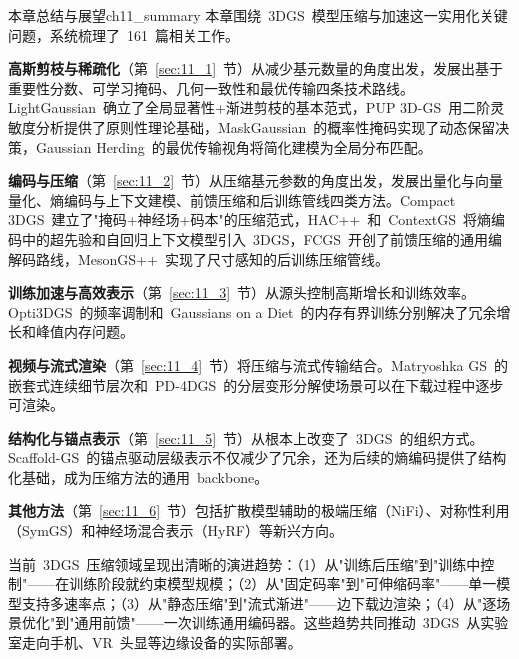 \begin{futurebox}{本章总结与展望}{ch11_summary}
本章围绕~3DGS~模型压缩与加速这一实用化关键问题，系统梳理了~161~篇相关工作。

\textbf{高斯剪枝与稀疏化}（第~\ref{sec:11_1}~节）从减少基元数量的角度出发，发展出基于重要性分数、可学习掩码、几何一致性和最优传输四条技术路线。LightGaussian~确立了全局显著性+渐进剪枝的基本范式，PUP 3D-GS~用二阶灵敏度分析提供了原则性理论基础，MaskGaussian~的概率性掩码实现了动态保留决策，Gaussian Herding~的最优传输视角将简化建模为全局分布匹配。

\textbf{编码与压缩}（第~\ref{sec:11_2}~节）从压缩基元参数的角度出发，发展出量化与向量量化、熵编码与上下文建模、前馈压缩和后训练管线四类方法。Compact 3DGS~建立了"掩码+神经场+码本"的压缩范式，HAC++~和~ContextGS~将熵编码中的超先验和自回归上下文模型引入~3DGS，FCGS~开创了前馈压缩的通用编解码路线，MesonGS++~实现了尺寸感知的后训练压缩管线。

\textbf{训练加速与高效表示}（第~\ref{sec:11_3}~节）从源头控制高斯增长和训练效率。Opti3DGS~的频率调制和~Gaussians on a Diet~的内存有界训练分别解决了冗余增长和峰值内存问题。

\textbf{视频与流式渲染}（第~\ref{sec:11_4}~节）将压缩与流式传输结合。Matryoshka GS~的嵌套式连续细节层次和~PD-4DGS~的分层变形分解使场景可以在下载过程中逐步可渲染。

\textbf{结构化与锚点表示}（第~\ref{sec:11_5}~节）从根本上改变了~3DGS~的组织方式。Scaffold-GS~的锚点驱动层级表示不仅减少了冗余，还为后续的熵编码提供了结构化基础，成为压缩方法的通用~backbone。

\textbf{其他方法}（第~\ref{sec:11_6}~节）包括扩散模型辅助的极端压缩（NiFi）、对称性利用（SymGS）和神经场混合表示（HyRF）等新兴方向。

当前~3DGS~压缩领域呈现出清晰的演进趋势：（1）从"训练后压缩"到"训练中控制"——在训练阶段就约束模型规模；（2）从"固定码率"到"可伸缩码率"——单一模型支持多速率点；（3）从"静态压缩"到"流式渐进"——边下载边渲染；（4）从"逐场景优化"到"通用前馈"——一次训练通用编码器。这些趋势共同推动~3DGS~从实验室走向手机、VR~头显等边缘设备的实际部署。
\end{futurebox}
